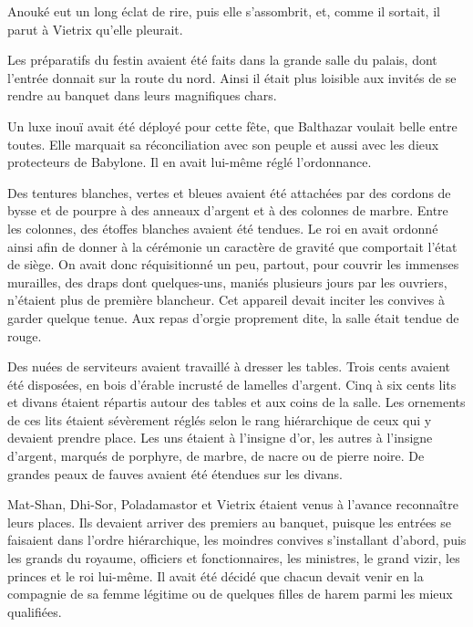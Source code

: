 \documentclass[a4paper, 11pt, oneside, polutonikogreek, french]{article}
\begin{document}
Anouké eut un long éclat de rire, puis elle s'assombrit, et, comme il sortait, il parut à Vietrix qu'elle pleurait.

\bigskip
\centerline{\EightStarTaper}
\centerline{\EightStarTaper\EightStarTaper}
\bigskip

Les préparatifs du festin avaient été faits dans la grande salle du palais, dont l'entrée donnait sur la route du nord. Ainsi il était plus loisible aux invités de se rendre au banquet dans leurs magnifiques chars.

Un luxe inouï avait été déployé pour cette fête, que Balthazar voulait belle entre toutes. Elle marquait sa réconciliation avec son peuple et aussi avec les dieux protecteurs de Babylone. Il en avait lui-même réglé l'ordonnance.

Des tentures blanches, vertes et bleues avaient été attachées par des cordons de bysse et de pourpre à des anneaux d'argent et à des colonnes de marbre. Entre les colonnes, des étoffes blanches avaient été tendues. Le roi en avait ordonné ainsi afin de donner à la cérémonie un caractère de gravité que comportait l'état de siège. On avait donc réquisitionné un peu, partout, pour couvrir les immenses murailles, des draps dont quelques-uns, maniés plusieurs jours par les ouvriers, n'étaient plus de première blancheur. Cet appareil devait inciter les convives à garder quelque tenue. Aux repas d'orgie proprement dite, la salle était tendue de rouge.

\bigskip
\centerline{\EightStarTaper}
\centerline{\EightStarTaper\EightStarTaper}
\bigskip

Des nuées de serviteurs avaient travaillé à dresser les tables. Trois cents avaient été disposées, en bois d'érable incrusté de lamelles d'argent. Cinq à six cents lits et divans étaient répartis autour des tables et aux coins de la salle. Les ornements de ces lits étaient sévèrement réglés selon le rang hiérarchique de ceux qui y devaient prendre place. Les uns étaient à l'insigne d'or, les autres à l'insigne d'argent, marqués de porphyre, de marbre, de nacre ou de pierre noire. De grandes peaux de fauves avaient été étendues sur les divans.

Mat-Shan, Dhi-Sor, Poladamastor et Vietrix étaient venus à l'avance reconnaître leurs places. Ils devaient arriver des premiers au banquet, puisque les entrées se faisaient dans l'ordre hiérarchique, les moindres convives s'installant d'abord, puis les grands du royaume, officiers et fonctionnaires, les ministres, le grand vizir, les princes et le roi lui-même. Il avait été décidé que chacun devait venir en la compagnie de sa femme légitime ou de quelques filles de harem parmi les mieux qualifiées.
\end{document}
